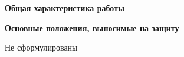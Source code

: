 \documentclass{article}
\begin{document}
    \Large

    \pagestyle{empty}
    

    \newpage
    \pagestyle{plain}
    

    \newpage
    \begin{center}
        \textbf{Общая характеристика работы}
    \end{center}
    

    

    

    

    

    

    \textbf{Основные положения, выносимые на защиту}
    
    Не сформулированы

    

    

    

    

    

    

    

    

    
\end{document}
